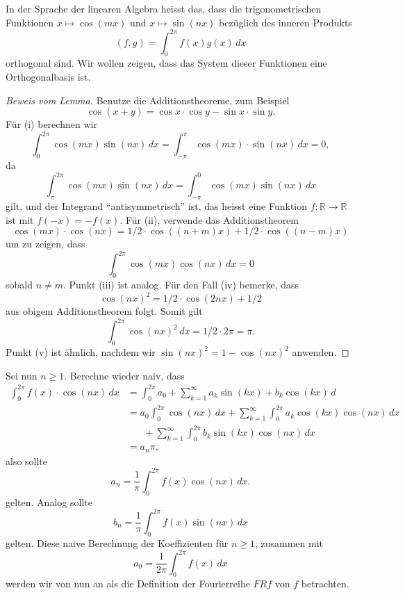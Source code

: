 \documentclass[../main.tex]{subfiles}
\begin{document}
In der Sprache der linearen Algebra 
heisst das, dass die trigonometrischen Funktionen
$x \mapsto \cos(mx)$ und $x \mapsto \sin(nx)$
bezüglich des inneren Produkts
\[
  (f, g) = \int_{0}^{2\pi} f(x) g(x) \, dx
\]
orthogonal sind.
Wir wollen zeigen, dass das System dieser Funktionen
eine Orthogonalbasis ist.

\begin{proof}[Beweis vom Lemma]
  Benutze die Additionstheoreme, zum Beispiel
  \[
    \cos(x + y) = \cos x \cdot \cos y - \sin x \cdot \sin y.
  \]
  Für (i) berechnen wir
  \[
    \int_{0}^{2\pi} \cos(mx) \sin(nx) \, dx
     = \int_{-\pi}^{\pi} \cos(mx) \cdot \sin(nx) \, dx = 0,
\]
  da
  \[
    \int_{\pi}^{2\pi} \cos(mx) \sin(nx) \, dx
    = \int_{-\pi}^{0} \cos(mx) \sin(nx) \, dx
  \]
  gilt, und der Integrand ``antisymmetrisch'' ist, das heisst eine
  Funktion $f \colon \mathbb{R} \to \mathbb{R}$ ist mit
  $f(-x) = -f(x)$.
  Für (ii), verwende das Additionstheorem 
  \[
    \cos(mx) \cdot \cos(nx) = 1/2 \cdot \cos((n+m)x) + 1/2 \cdot \cos ((n-m)x)
  \]
  um zu zeigen, dass
  \[
    \int_{0}^{2\pi} \cos(mx) \cos(nx) \, dx = 0
  \]
  sobald $n \neq m$. Punkt (iii) ist analog.
  Für den Fall (iv) bemerke, dass
  \[
    {\cos(nx)}^2 = 1/2 \cdot \cos(2nx) + 1/2
  \]
  aus obigem Additionstheorem folgt. Somit gilt
  \[
    \int_{0}^{2\pi} {\cos(nx)}^2 \, dx = 1/2 \cdot 2 \pi = \pi.
  \]
  Punkt (v) ist ähnlich, nachdem wir ${\sin(nx)}^2 = 1 - {\cos(nx)}^2$ anwenden.
\end{proof}

Sei nun $n \geq 1$.
Berechne wieder naiv, dass
\begin{align*}
  \int_{0}^{2\pi} f(x) \cdot \cos(nx) \, dx
  &= \int_{0}^{2\pi} a_0 + \sum_{k=1}^{\infty} a_k \sin(kx) + b_k \cos(kx) \, d  \\
  &= a_0 \int_{0}^{2\pi} \cos(nx) \, dx
  + \sum_{k=1}^{\infty} \int_{0}^{2\pi} a_k \cos(kx)\cos(nx) \, dx\\
  &\;\;\;\;\;\;  + \sum_{k=1}^{\infty} \int_{0}^{2\pi} b_k \sin(kx) \cos(nx) \, dx\\
  &= a_n \pi,
\end{align*}
also sollte
\[
  a_n = \frac{1}{\pi} \int_{0}^{2\pi} f(x) \cos(nx) \, dx.
\]
gelten.
Analog sollte
\[
  b_n = \frac{1}{\pi}\int_{0}^{2\pi} f(x) \sin(nx) \, dx
\]
gelten. Diese naive Berechnung der Koeffizienten für $n \geq 1$, zusammen mit
\[
  a_0 = \frac{1}{2\pi} \int_{0}^{2\pi} f(x) \, dx
\]
werden wir von nun
an als die Definition der Fourierreihe $FRf$ von $f$ betrachten.
\end{document}
